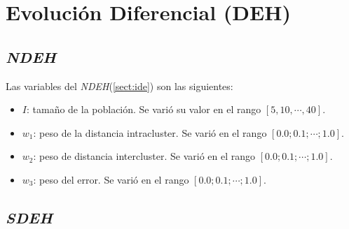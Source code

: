         
        
        \begin{landscape}

        
        
        \end{landscape}

\section{Evolución Diferencial (DEH)}

    \subsection{\emph{NDEH}}\label{sect:ande}

        Las variables del \emph{NDEH}(\ref{sect:ide}) son las siguientes:
        \begin{itemize}
            \item $I$: tamaño de la población. Se varió su valor en el rango
        $[5, 10, \cdots, 40]$.
            \item $w_1$: peso de la distancia intracluster. Se varió en el rango
        $[0.0; 0.1; \cdots; 1.0]$.
            \item $w_2$: peso de distancia intercluster. Se varió en el rango
        $[0.0; 0.1; \cdots; 1.0]$.
            \item $w_3$: peso del error. Se varió en el rango
        $[0.0; 0.1; \cdots; 1.0]$.
        \end{itemize}

        

        

        
        
        

    \subsection{\emph{SDEH}}\label{sect:asde}

